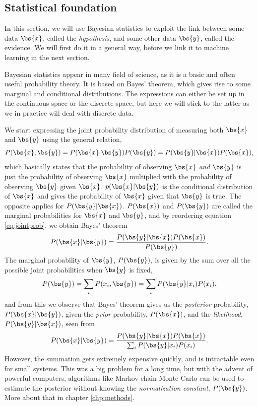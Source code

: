 \subsection{Statistical foundation} \label{sec:bayes}
In this section, we will use Bayesian statistics to exploit the link between some data $\bs{x}$, called the \textit{hypothesis}, and some other data $\bs{y}$, called the evidence.  We will first do it in a general way, before we link it to machine learning in the next section.

Bayesian statistics appear in many field of science, as it is a basic and often useful probability theory. It is based on Bayes' theorem, which gives rise to some marginal and conditional distributions. The expressions can either be set up in the continuous space or the discrete space, but here we will stick to the latter as we in practice will deal with discrete data. 

We start expressing the joint probability distribution of measuring both $\bs{x}$ and $\bs{y}$ using the general relation,
\begin{equation}
P(\bs{x},\bs{y})=P(\bs{x}|\bs{y})P(\bs{y})=P(\bs{y}|\bs{x})P(\bs{x}),
\label{eq:jointprob}
\end{equation}
which basically states that the probability of observing $\bs{x}$ \textit{and} $\bs{y}$ is just the probability of observing $\bs{x}$ multiplied with the probability of observing $\bs{y}$ given $\bs{x}$. 
$p(\bs{x}|\bs{y})$ is the conditional distribution of $\bs{x}$ and gives the probability of $\bs{x}$ given that $\bs{y}$ is true. The opposite applies for $P(\bs{y}|\bs{x})$. $P(\bs{x})$ and $P(\bs{y})$ are called the marginal probabilities for $\bs{x}$ and $\bs{y}$, and by reordering equation \eqref{eq:jointprob}, we obtain Bayes' theorem
\begin{equation}
P(\bs{x}|\bs{y})=\frac{P(\bs{y}|\bs{x})P(\bs{x})}{P(\bs{y})}.
\end{equation}
The marginal probability of $\bs{y}$, $P(\bs{y})$, is given by the sum over all the possible joint probabilities when $\bs{y}$ is fixed,
\begin{equation}
P(\bs{y})=\sum_i P(x_i,\bs{y}) = \sum_i P(\bs{y}|x_i)P(x_i),
\end{equation}
and from this we observe that Bayes' theorem gives us the \textit{posterior} probability, $P(\bs{x}|\bs{y})$, given the \textit{prior} probability, $P(\bs{x})$, and the \textit{likelihood}, $P(\bs{y}|\bs{x})$, seen from
\begin{equation}
P(\bs{x}|\bs{y})=\frac{P(\bs{y}|\bs{x})P(\bs{x})}{\sum_i P(\bs{y}|x_i)P(x_i)}.
\end{equation}
However, the summation gets extremely expensive quickly, and is intractable even for small systems. This was a big problem for a long time, but with the advent of powerful computers, algorithms like Markov chain Monte-Carlo can be used to estimate the posterior without knowing the \textit{normalization constant}, $P(\bs{y})$. More about that in chapter \ref{chp:methods}. 


